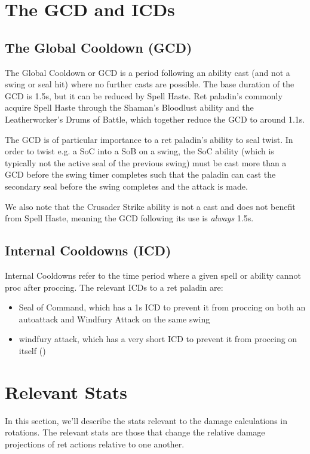 \documentclass[letterpaper,11pt]{article}
\begin{document}
	\section{The GCD and ICDs}
	\subsection{The Global Cooldown (GCD)}
	The Global Cooldown or GCD is a period following an ability cast (and not a swing or seal hit) where no further casts are possible.
	The base duration of the GCD is 1.5s, but it can be reduced by Spell Haste.
	Ret paladin's commonly acquire Spell Haste through the Shaman's Bloodlust ability and the Leatherworker's Drums of Battle, which together reduce the GCD to around 1.1s.
	
	The GCD is of particular importance to a ret paladin's ability to seal twist.
	In order to twist e.g. a SoC into a SoB on a swing, the SoC ability (which is typically not the active seal of the previous swing) must be cast more than a GCD before the swing timer completes such that the paladin can cast the secondary seal before the swing completes and the attack is made.
	
	We also note that the Crusader Strike ability is not a cast and does not benefit from Spell Haste, meaning the GCD following its use is \emph{always} 1.5s.
	
	\subsection{Internal Cooldowns (ICD)}
	Internal Cooldowns refer to the time period where a given spell or ability cannot proc after proccing.
	The relevant ICDs to a ret paladin are:
	\begin{itemize}
		\item Seal of Command, which has a 1s ICD to prevent it from proccing on both an autoattack and Windfury Attack on the same swing
		\item windfury attack, which has a very short ICD to prevent it from proccing on itself ()
	\end{itemize}

	\section{Relevant Stats}
	In this section, we'll describe the stats relevant to the damage calculations in rotations.
	The relevant stats are those that change the relative damage projections of ret actions relative to one another.
	
\end{document}
